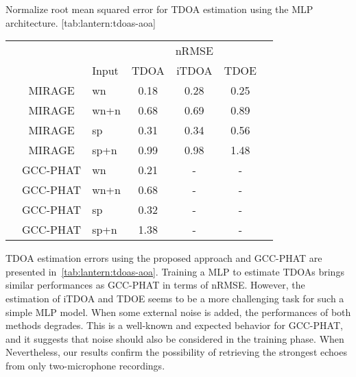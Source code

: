 \begin{table}[h]
    \begin{sidecaption}{%
        Normalize root mean squared error for TDOA estimation using the \ac{MLP} architecture.
    }[tab:lantern:tdoas-aoa]
    \centering
    \footnotesize
    \small
    \begin{tabular*}{\linewidth}{@{\extracolsep{\fill}}lcl|cccc@{}}
    \toprule
    &            &         &          & nRMSE           &\\
    &            & Input   &    \ac{TDOA}  	&   \ac{iTDOA} 		 &     \ac{TDOE}   	&\\
    \midrule
    & MIRAGE      &   wn    & 0.18    & 0.28  & 0.25 	& \\
    & MIRAGE      &   wn+n  & 0.68    & 0.69  & 0.89 	& \\
    & MIRAGE      &   sp    & 0.31    & 0.34  & 0.56    & \\
    & MIRAGE      &   sp+n  & 0.99    & 0.98  & 1.48 	& \\
    & GCC-PHAT    &   wn    & 0.21    & -     & -		& \\
    & GCC-PHAT    &   wn+n  & 0.68    & -     & -		& \\
    & GCC-PHAT    &   sp 	& 0.32    & -     & -		& \\
    & GCC-PHAT    &   sp+n  & 1.38    & -     & -		& \\
    \bottomrule
    \end{tabular*}
    \end{sidecaption}
\end{table}

\mynewline
\ac{TDOA} estimation errors using the proposed approach and \ac{GCC-PHAT} are presented in~\cref{tab:lantern:tdoas-aoa}.
Training a \ac{MLP} to estimate \acp{TDOA} brings similar performances as \ac{GCC-PHAT} in terms of nRMSE.
However, the estimation of \ac{iTDOA} and \ac{TDOE} seems to be a more challenging task for such a simple \ac{MLP} model.
When some external noise is added, the performances of both methods degrades.
This is a well-known and expected behavior for \ac{GCC-PHAT}, and it suggests that noise should also be considered in the training phase. When
Nevertheless, our results confirm the possibility of retrieving the strongest echoes from only two-microphone recordings.

